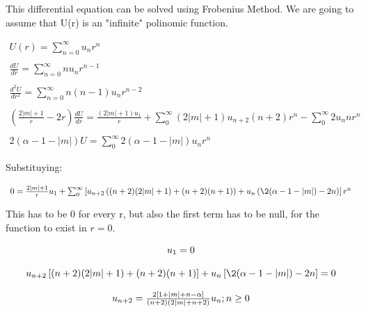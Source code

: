 This differential equation can be solved using Frobenius Method. We are going to assume that U(r) is an "infinite" polinomic function.

\begin{equation}
  \begin{array}{c}
  U(r) = \sum_{n=0}^{\infty} u_n r^n
  \\

  \\
  \frac{dU}{dr} = \sum_{n=0}^{\infty} n u_n r^{n-1}
  \\

  \\
  \frac{d^2U}{dr^2} = \sum_{n=0}^{\infty} n(n-1) u_n r^{n-2}
  \\

  \\
  \left(\frac{2|m|+1}{r}-2r\right)\frac{dU}{dr} = \frac{(2|m|+1)u_1}{r} + \sum_{0}^{\infty} (2|m|+1)u_{n+2}(n+2)r^n - \sum_{0}^{\infty} 2 u_n n r^n
  \\

  \\
  2(\alpha-1-|m|) U = \sum_{0}^{\infty} 2(\alpha-1-|m|)  u_n r^n
  \end{array}
\end{equation}

Substituying:

\begin{equation}
  \begin{array}{c}
    0 = \frac{2|m|+1}{r}u_1 + \sum_{0}^{\infty} \left[u_{n+2}\left((n+2)(2|m|+1)+(n+2)(n+1)\right)+u_n\left(\2(\alpha-1-|m|)-2n\right)\right]r^n
  \end{array}
\end{equation}

This has to be 0 for every r, but also the first term has to be null, for the function to exist in $r=0$.

\begin{equation}
  \begin{array}{c}
    u_1 = 0
    \\

    \\
    u_{n+2}\left[(n+2)(2|m|+1)+(n+2)(n+1)\right]+u_n\left[\2(\alpha-1-|m|)-2n\right] = 0
    \\

    \\
    u_{n+2} = \frac{2[1+|m|+n-\alpha]}{(n+2)(2|m|+n+2)}u_n ; n\geq0
  \end{array}
\end{equation}

